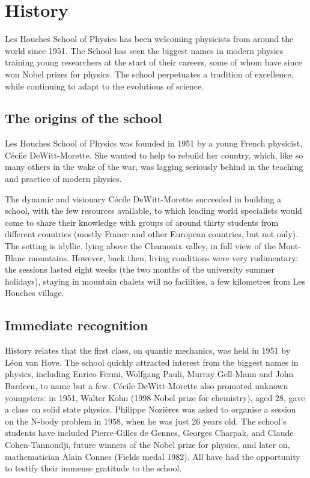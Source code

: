 \chapter{History}

Les Houches School of Physics has been welcoming physicists from around the world since 1951. The School has seen the biggest names in modern physics training young researchers at the start of their careers, some of whom have since won Nobel prizes for physics. The school perpetuates a tradition of excellence, while continuing to adapt to the evolutions of science.

\section{The origins of the school}

Les Houches School of Physics was founded in 1951 by a young French physicist, Cécile DeWitt-Morette. She wanted to help to rebuild her country, which, like so many others in the wake of the war, was lagging seriously behind in the teaching and practice of modern physics.

The dynamic and visionary Cécile DeWitt-Morette succeeded in building a school, with the few resources available, to which leading world specialists would come to share their knowledge with groups of around thirty students from different countries (mostly France and other European countries, but not only). The setting is idyllic, lying above the Chamonix valley, in full view of the Mont-Blanc mountains. However, back then, living conditions were very rudimentary: the sessions lasted eight weeks (the two months of the university summer holidays), staying in mountain chalets will no facilities, a few kilometres from Les Houches village.

\section{Immediate recognition}

History relates that the first class, on quantic mechanics, was held in 1951 by Léon van Hove. The school quickly attracted interest from the biggest names in physics, including Enrico Fermi, Wolfgang Pauli, Murray Gell-Mann and John Bardeen, to name but a few. Cécile DeWitt-Morette also promoted unknown youngsters: in 1951, Walter Kohn (1998 Nobel prize for chemistry), aged 28, gave a class on solid state physics. Philippe Nozières was asked to organise a session on the N-body problem in 1958, when he was just 26 years old. The school’s students have included Pierre-Gilles de Gennes, Georges Charpak, and Claude Cohen-Tannoudji, future winners of the Nobel prize for physics, and later on, mathematician Alain Connes (Fields medal 1982). All have had the opportunity to testify their immense gratitude to the school.

